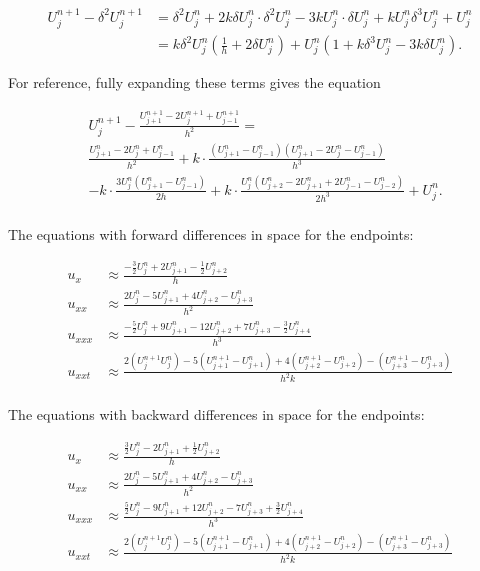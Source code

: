 \documentclass[fleqn]{article}
\begin{document}
\begin{align*}
U_j^{n+1} - \delta^2 U_j^{n+1} &= \delta^2 U_j^n + 2k\delta U_j^n \cdot \delta ^2U_j^n - 3 k U_j^n \cdot \delta U_j^n + k U_j^n \delta^3 U_j^n + U_j^n \\
&= k \delta^2 U_j^n \left( \frac{1}{h} + 2 \delta U_j^n \right) + U_j^n \left(1 + k \delta^3 U_j^n - 3 k \delta U_j^n \right).
\end{align*}

For reference, fully expanding these terms gives the equation

\begin{align*}
&U_{j}^{n+1} - \frac{U_{j+1}^{n+1}-2U_{j}^{n+1}+U_{j-1}^{n+1}}{h^{2}} = \\
&\frac{U_{j+1}^n - 2U_j^n + U_{j-1}^n}{h^2} +k \cdot \frac{\left(U_{j+1}^n - U_{j-1}^n\right)\left(U_{j+1}^n-2U_{j}^n-U_{j-1}^n\right)}{h^{3}}\\
&-k \cdot \frac{3U_{j}^n\left(U_{j+1}^n-U_{j-1}^n\right)}{2h} +k \cdot \frac{U_{j}^n\left(U_{j+2}^n-2U_{j+1}^n+2U_{j-1}^n-U_{j-2}^n\right)}{2h^{3}} + U_{j}^n.\\
\end{align*}

\newpage
The equations with forward differences in space for the endpoints:

\begin{align*}
u_x &\approx \frac{-\frac{3}{2}U_j^n+2U_{j+1}^n-\frac{1}{2}U_{j+2}^n}{h} \\
u_{xx} &\approx \frac{2U_j^n-5U_{j+1}^n+4U_{j+2}^n-U_{j+3}^n}{h^{2}} \\
u_{xxx} &\approx \frac{-\frac{5}{2}U_j^n+9U_{j+1}^n-12U_{j+2}^n+7U_{j+3}^n-\frac{3}{2}U_{j+4}^n}{h^{3}} \\
u_{xxt} &\approx \frac{2\left(U_j^{n+1}U_j^n\right)-5\left(U_{j+1}^{n+1}-U_{j+1}^{n}\right)+4\left(U_{j+2}^{n+1}-U_{j+2}^n\right)-\left(U_{j+3}^{n+1}-U_{j+3}^n\right)}{h^{2}k} \\
\end{align*}

The equations with backward differences in space for the endpoints:

\begin{align*}
u_x &\approx \frac{\frac{3}{2}U_j^n-2U_{j+1}^n+\frac{1}{2}U_{j+2}^n}{h} \\
u_{xx} &\approx \frac{2U_j^n-5U_{j+1}^n+4U_{j+2}^n-U_{j+3}^n}{h^{2}} \\
u_{xxx} &\approx \frac{\frac{5}{2}U_j^n-9U_{j+1}^n+12U_{j+2}^n-7U_{j+3}^n+\frac{3}{2}U_{j+4}^n}{h^{3}} \\
u_{xxt} &\approx \frac{2\left(U_j^{n+1}U_j^n\right)-5\left(U_{j+1}^{n+1}-U_{j+1}^{n}\right)+4\left(U_{j+2}^{n+1}-U_{j+2}^n\right)-\left(U_{j+3}^{n+1}-U_{j+3}^n\right)}{h^{2}k} \\
\end{align*}
\end{document}
